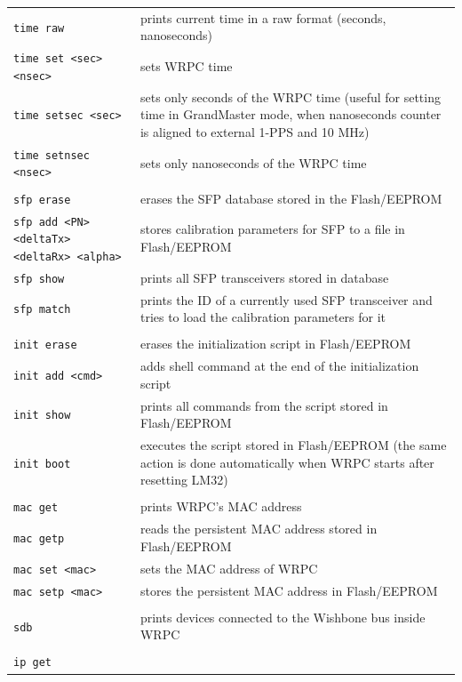 \documentclass[a4paper, 12pt]{article}
\newcommand{\code}[1]{\texttt{#1}}
\begin{document}
\begin{longtable}{  p{7.5cm}  p{7cm} }
  \code{time raw} &  prints current time in a raw format (seconds, nanoseconds)\\

  \code{time set <sec> <nsec>} & sets WRPC time\\

  \code{time setsec <sec>} & sets only seconds of the WRPC time
(useful for setting time in GrandMaster mode, when nanoseconds counter is
aligned to external 1-PPS and 10 MHz)\\

  \code{time setnsec <nsec>} & sets only nanoseconds of the WRPC time\\
 & \\
  \code{sfp erase} & erases the SFP database stored in the Flash/EEPROM\\

  \code{sfp add <PN> <deltaTx> <deltaRx> <alpha>} & stores calibration
parameters for SFP to a file in Flash/EEPROM\\

  \code{sfp show} & prints all SFP transceivers stored in database\\

  \code{sfp match} & prints the ID of a currently used SFP
transceiver and tries to load the calibration parameters for it\\
 & \\
  \code{init erase} & erases the initialization script in Flash/EEPROM \\

  \code{init add <cmd>} & adds shell command at the end of the
initialization script\\

  \code{init show} & prints all commands from the script stored in Flash/EEPROM\\

  \code{init boot} & executes the script stored in Flash/EEPROM (the same action
is done automatically when WRPC starts after resetting LM32)\\
 & \\
  \code{mac get} & prints WRPC's MAC address\\

  \code{mac getp} & reads the persistent MAC address stored in Flash/EEPROM\\

  \code{mac set <mac>} & sets the MAC address of WRPC\\

  \code{mac setp <mac>} & stores the persistent MAC address in Flash/EEPROM\\
 & \\
  \code{sdb} & prints devices connected to the Wishbone bus inside WRPC\\
 & \\
  \code{ip get} & \\


\end{longtable}
\end{document}
